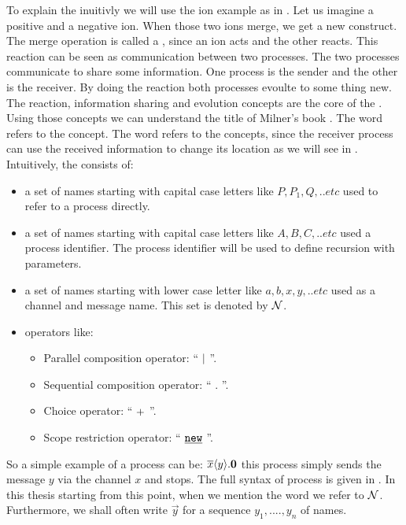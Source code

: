To explain the \picalc{} inuitivly we will use the ion example as in \cite{milner}. Let us imagine a positive and a negative ion. When those two ions merge, we get a new construct. The merge operation is called a , since an ion acts and the other reacts. This reaction can be seen as communication between two processes. The two processes communicate to share some information.  One process is the sender and the other is the receiver. By doing the reaction both processes evoulte to some thing new. The reaction, information sharing and evolution concepts are the core of the \picalc{}. Using those concepts we can understand the title of Milner's book  \picalc{} \cite{milner}. The word  refers to the  concept. The word  refers to the  concepts, since the receiver process can use the received information to change its location as we will see in .
\\Intuitively, the \picalc{} consists of: 
\begin{itemize}
\item a set of names starting with capital case letters  like $P, P_1, Q,..etc$  used to refer to a process directly.
\item a set of names starting with capital case letters  like $A, B, C,..etc$  used a process identifier. The process identifier will be used to define recursion with parameters.
\item a set of names starting with lower case letter like $a, b, x, y,..etc$  used as a channel and message name. This set is denoted by $\mathcal N$.
\item operators like:
	\begin{itemize}
	\item  Parallel composition operator: `` $\mid$ ''.
	\item  Sequential composition operator: `` $.$ ''.
	\item  Choice operator: `` $+$ ''.
	\item  Scope restriction operator: `` $\procres{}{}$ ''.
	\end{itemize}
\end{itemize}
So a simple example of a process can be: $\overline{x}\langle y\rangle.\mathbf{0}$ this process simply sends the message $y$ via the channel $x$ and stops.
The full syntax of \picalc{} process is given in . In this thesis starting from this point, when we mention the word  we refer to $\mathcal N$. Furthermore, we shall often write $\vec{y}$ for a sequence $y_1,....,y_n$ of names.
